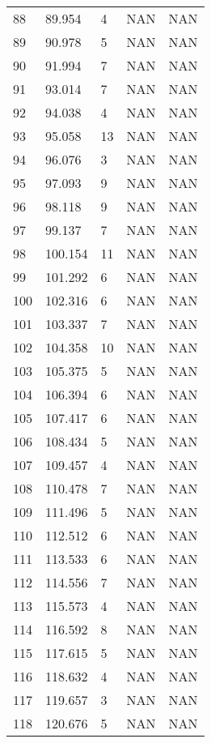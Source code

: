 \documentclass{article}
\begin{document}
\begin{longtable}{@{}lllll@{}}
				88  & 89.954  & 4     & NAN   & NAN   \\
				89  & 90.978  & 5     & NAN   & NAN   \\
				90  & 91.994  & 7     & NAN   & NAN   \\
				91  & 93.014  & 7     & NAN   & NAN   \\
				92  & 94.038  & 4     & NAN   & NAN   \\
				93  & 95.058  & 13    & NAN   & NAN   \\
				94  & 96.076  & 3     & NAN   & NAN   \\
				95  & 97.093  & 9     & NAN   & NAN   \\
				96  & 98.118  & 9     & NAN   & NAN   \\
				97  & 99.137  & 7     & NAN   & NAN   \\
				98  & 100.154 & 11    & NAN   & NAN   \\
				99  & 101.292 & 6     & NAN   & NAN   \\
				100 & 102.316 & 6     & NAN   & NAN   \\
				101 & 103.337 & 7     & NAN   & NAN   \\
				102 & 104.358 & 10    & NAN   & NAN   \\
				103 & 105.375 & 5     & NAN   & NAN   \\
				104 & 106.394 & 6     & NAN   & NAN   \\
				105 & 107.417 & 6     & NAN   & NAN   \\
				106 & 108.434 & 5     & NAN   & NAN   \\
				107 & 109.457 & 4     & NAN   & NAN   \\
				108 & 110.478 & 7     & NAN   & NAN   \\
				109 & 111.496 & 5     & NAN   & NAN   \\
				110 & 112.512 & 6     & NAN   & NAN   \\
				111 & 113.533 & 6     & NAN   & NAN   \\
				112 & 114.556 & 7     & NAN   & NAN   \\
				113 & 115.573 & 4     & NAN   & NAN   \\
				114 & 116.592 & 8     & NAN   & NAN   \\
				115 & 117.615 & 5     & NAN   & NAN   \\
				116 & 118.632 & 4     & NAN   & NAN   \\
				117 & 119.657 & 3     & NAN   & NAN   \\
				118 & 120.676 & 5     & NAN   & NAN   \\

\end{longtable}
\end{document}
